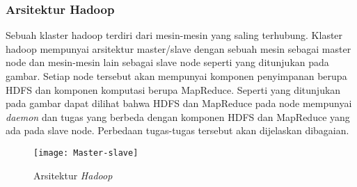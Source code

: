 \subsubsection{Arsitektur Hadoop}
Sebuah klaster hadoop terdiri dari mesin-mesin yang saling terhubung. Klaster hadoop mempunyai arsitektur master/slave dengan sebuah mesin sebagai master node dan mesin-mesin lain sebagai slave node seperti yang ditunjukan pada gambar. Setiap node tersebut akan mempunyai komponen penyimpanan berupa HDFS dan komponen komputasi berupa MapReduce. Seperti yang ditunjukan pada gambar dapat dilihat bahwa HDFS dan MapReduce pada node mempunyai \textit{daemon} dan tugas yang berbeda dengan komponen HDFS dan MapReduce yang ada pada slave node. Perbedaan tugas-tugas tersebut akan dijelaskan dibagaian.

	\begin{figure}[H] 
	\centering  
	\texttt{[image: Master-slave]}  
	\caption[Gambar Arsitektur { \it Hadoop}]{Arsitektur {\it Hadoop}} 
	\label{fig:processing-events relationship} 
	\end{figure}

